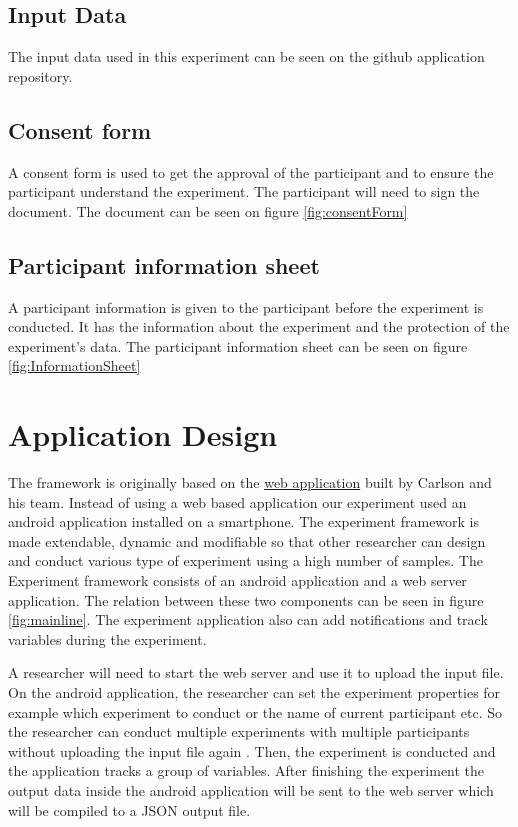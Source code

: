 \subsection{Input Data}
The input data used in this experiment can be seen on the github application repository.


\subsection{Consent form}
A consent form is used to get the approval of the participant and to ensure the participant understand the experiment. The participant will need to sign the document. The document can be seen on figure \ref{fig:consentForm}
\subsection{Participant information sheet}
A participant information is given to the participant before the experiment is conducted. It has the information about the experiment and the protection of the experiment's data. The participant information sheet can be seen on figure \ref{fig:InformationSheet}

\section{Application Design}

The framework is originally based on the \href{https://pennstate.qualtrics.com/jfe/form/SV_dpaKW6wlA1Fr7BX}
{web application} built by Carlson and his team.
Instead of using a web based application our experiment used an android application installed on a smartphone.
The experiment framework is made extendable, dynamic and modifiable so that other researcher can design and conduct various type of experiment using a high number of samples.
 The Experiment framework consists of an android application and a web server application.
 The relation between these two components can be seen in figure \ref{fig:mainline}.
 The experiment application also can add notifications and track variables during the experiment.

 A researcher will need to start the web server and use it to upload the input file.
 On the android application, the researcher can set the experiment properties for example which experiment to conduct or the name of current participant etc.
 So the researcher can conduct multiple experiments with multiple participants without uploading the input file again
 . Then, the experiment is conducted and the application tracks a group of variables.
 After finishing the experiment the output data inside the android application will be sent to the web server which will be compiled to a JSON output file.

